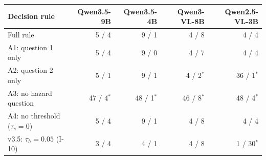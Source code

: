 \begin{tabular}{lrrrr}
\toprule
Decision rule & Qwen3.5-9B & Qwen3.5-4B & Qwen3-VL-8B & Qwen2.5-VL-3B \\
\midrule
Full rule & 5 / 4 & 9 / 1 & 4 / 8 & 4 / 4 \\
A1: question 1 only & 5 / 4 & 9 / 0 & 4 / 7 & 4 / 4 \\
A2: question 2 only & 5 / 1 & 9 / 1 & 4 / 2$^{*}$ & 36 / 1$^{*}$ \\
A3: no hazard question & 47 / 4$^{*}$ & 48 / 1$^{*}$ & 46 / 8$^{*}$ & 48 / 4$^{*}$ \\
A4: no threshold ($\tau_s{=}0$) & 5 / 4 & 9 / 1 & 4 / 8 & 4 / 4 \\
v3.5: $\tau_h{=}0.05$ (I-10) & 3 / 4 & 4 / 1 & 4 / 8 & 1 / 30$^{*}$ \\
\bottomrule
\end{tabular}
